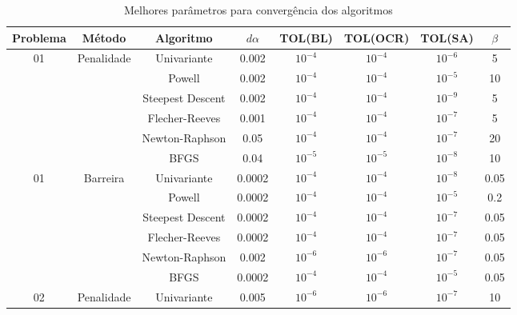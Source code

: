\documentclass[10pt, a4paper]{article}
\begin{document}
\begin{table}[H]
      \small
      \centering
      \caption{Melhores par\^ametros para converg\^encia dos algoritmos}
      \begin{tabular}{c|c|c|c|c|c|c|c}
            Problema & M\'etodo & Algoritmo & $d\alpha$ & TOL(BL) & TOL(OCR) & TOL(SA) & $\beta$ \\
            \hline
            \multirow{6}{*}{01} & \multirow{6}{*}{Penalidade} & Univariante       & 0.002 & $10^{-4}$ & $10^{-4}$ & $10^{-6}$ & 5   \\
                                                            & & Powell            & 0.002 & $10^{-4}$ & $10^{-4}$ & $10^{-5}$ & 10  \\
                                                            & & Steepest Descent  & 0.002 & $10^{-4}$ & $10^{-4}$ & $10^{-9}$ & 5   \\
                                                            & & Flecher-Reeves    & 0.001 & $10^{-4}$ & $10^{-4}$ & $10^{-7}$ & 5   \\
                                                            & & Newton-Raphson    & 0.05  & $10^{-4}$ & $10^{-4}$ & $10^{-7}$ & 20  \\
                                                            & & BFGS              & 0.04  & $10^{-5}$ & $10^{-5}$ & $10^{-8}$ & 10  \\
            \hline
            \multirow{6}{*}{01} & \multirow{6}{*}{Barreira} & Univariante         & 0.0002 & $10^{-4}$ & $10^{-4}$ & $10^{-8}$ & 0.05 \\
                                                            & & Powell            & 0.0002 & $10^{-4}$ & $10^{-4}$ & $10^{-5}$ & 0.2  \\
                                                            & & Steepest Descent  & 0.0002 & $10^{-4}$ & $10^{-4}$ & $10^{-7}$ & 0.05 \\
                                                            & & Flecher-Reeves    & 0.0002 & $10^{-4}$ & $10^{-4}$ & $10^{-7}$ & 0.05 \\
                                                            & & Newton-Raphson    & 0.002  & $10^{-6}$ & $10^{-6}$ & $10^{-7}$ & 0.05 \\
                                                            & & BFGS              & 0.0002 & $10^{-4}$ & $10^{-4}$ & $10^{-5}$ & 0.05 \\
            \hline
            \multirow{6}{*}{02} & \multirow{6}{*}{Penalidade} & Univariante       & 0.005  & $10^{-6}$ & $10^{-6}$ & $10^{-7}$ & 10 \\

\end{tabular}
\end{table}
\end{document}
